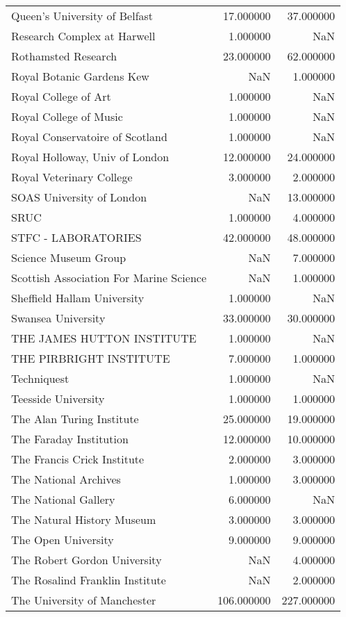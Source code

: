 \begin{tabular}{lrr}
Queen's University of Belfast & 17.000000 & 37.000000 \\
Research Complex at Harwell & 1.000000 & NaN \\
Rothamsted Research & 23.000000 & 62.000000 \\
Royal Botanic Gardens Kew & NaN & 1.000000 \\
Royal College of Art & 1.000000 & NaN \\
Royal College of Music & 1.000000 & NaN \\
Royal Conservatoire of Scotland & 1.000000 & NaN \\
Royal Holloway, Univ of London & 12.000000 & 24.000000 \\
Royal Veterinary College & 3.000000 & 2.000000 \\
SOAS University of London & NaN & 13.000000 \\
SRUC & 1.000000 & 4.000000 \\
STFC - LABORATORIES & 42.000000 & 48.000000 \\
Science Museum Group & NaN & 7.000000 \\
Scottish Association For Marine Science & NaN & 1.000000 \\
Sheffield Hallam University & 1.000000 & NaN \\
Swansea University & 33.000000 & 30.000000 \\
THE JAMES HUTTON INSTITUTE & 1.000000 & NaN \\
THE PIRBRIGHT INSTITUTE & 7.000000 & 1.000000 \\
Techniquest & 1.000000 & NaN \\
Teesside University & 1.000000 & 1.000000 \\
The Alan Turing Institute & 25.000000 & 19.000000 \\
The Faraday Institution & 12.000000 & 10.000000 \\
The Francis Crick Institute & 2.000000 & 3.000000 \\
The National Archives & 1.000000 & 3.000000 \\
The National Gallery & 6.000000 & NaN \\
The Natural History Museum & 3.000000 & 3.000000 \\
The Open University & 9.000000 & 9.000000 \\
The Robert Gordon University & NaN & 4.000000 \\
The Rosalind Franklin Institute & NaN & 2.000000 \\
The University of Manchester & 106.000000 & 227.000000 \\

\end{tabular}
